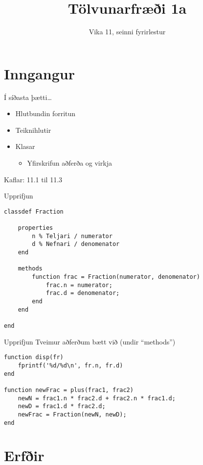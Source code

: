 \documentclass{beamer}
\title{Tölvunarfræði 1a}
\subtitle{Vika 11, seinni fyrirlestur}
\begin{document}
\begin{frame}
\titlepage
\end{frame}

\section{Inngangur}

\begin{frame}{Í síðasta þætti\ldots}
\begin{itemize}
 \item Hlutbundin forritun
 \item Teiknihlutir
 \item Klasar
 \begin{itemize}
  \item Yfirskrifun aðferða og virkja
 \end{itemize}
\end{itemize}
Kaflar: 11.1 til 11.3
\end{frame}

\begin{frame}[fragile]{Upprifjun}
\begin{verbatim}
classdef Fraction

    properties
        n % Teljari / numerator
        d % Nefnari / denomenator
    end
    
    methods
        function frac = Fraction(numerator, denomenator)
            frac.n = numerator;
            frac.d = denomenator;
        end
    end
    
end
\end{verbatim}
\end{frame}

\begin{frame}[fragile]{Upprifjun}
Tveimur aðferðum bætt við (undir ``methods'')
\begin{verbatim}
function disp(fr)
    fprintf('%d/%d\n', fr.n, fr.d)
end

function newFrac = plus(frac1, frac2)
    newN = frac1.n * frac2.d + frac2.n * frac1.d;
    newD = frac1.d * frac2.d;
    newFrac = Fraction(newN, newD);
end
\end{verbatim}
\end{frame}

\section{Erfðir}
\end{document}
